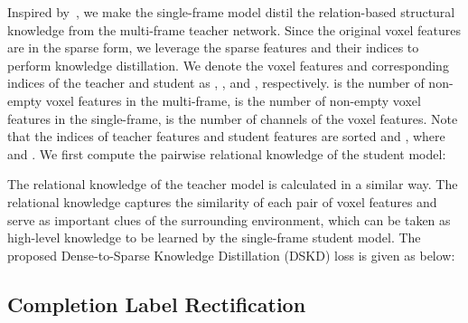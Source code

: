 \documentclass[10pt,twocolumn,letterpaper]{article}
\begin{document}
Inspired by~\cite{pvkd2022}, we make the single-frame model distil the relation-based structural knowledge from the multi-frame teacher network. Since the original voxel features are in the sparse form, we leverage the sparse features and their indices to perform knowledge distillation. We denote the voxel features and corresponding indices of the teacher and student as , ,  and , respectively.  is the number of non-empty voxel features in the multi-frame,  is the number of non-empty voxel features in the single-frame,  is the number of channels of the voxel features. Note that the indices of teacher features and student features are sorted and , where  and . We first compute the pairwise relational knowledge of the student model:



The relational knowledge of the teacher model  is calculated in a similar way. The relational knowledge captures the similarity of each pair of voxel features and serve as important clues of the surrounding environment, which can be taken as high-level knowledge to be learned by the single-frame student model. The proposed Dense-to-Sparse Knowledge Distillation (DSKD) loss is given as below:




\subsection{Completion Label Rectification}
\end{document}
